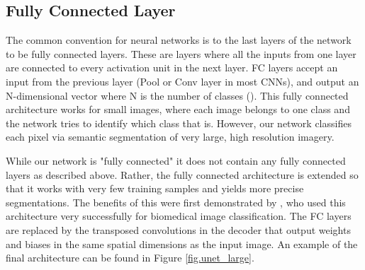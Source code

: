 \subsection{Fully Connected Layer}
The common convention for neural networks is to the last layers of the network to be fully connected layers. These are layers where all the inputs from one layer are connected to every activation unit in the next layer. FC layers accept an input from the previous layer (Pool or Conv layer in most CNNs), and output an N-dimensional vector where N is the number of classes (\cite{simard03}). This fully connected architecture works for small images, where each image belongs to one class and the network tries to identify which class that is. However, our network classifies each pixel via semantic segmentation of very large, high resolution imagery.
\par
While our network is "fully connected" it does not contain any fully connected layers as described above. Rather, the fully connected architecture is extended so that it works with very few training samples and yields more precise segmentations. The benefits of this were first demonstrated by \citet{ronneberger15}, who used this architecture very successfully for biomedical image classification.  The FC layers are replaced by the transposed convolutions in the decoder that output weights and biases in the same spatial dimensions as the input image. An example of the final architecture can be found in \citet{Richmond19a} Figure \ref{fig.unet_large}.


